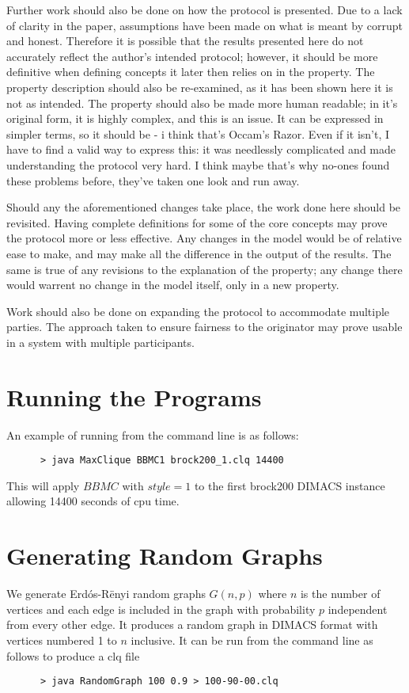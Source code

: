 \documentclass{l4proj}
\begin{document}
Further work should also be done on how the protocol is presented. Due to a lack of clarity in the paper, assumptions have been made on what is meant by corrupt and honest. Therefore it is possible that the results presented here do not accurately reflect the author's intended protocol; however, it should be more definitive when defining concepts it later then relies on in the property. The property description should also be re-examined, as it has been shown here it is not as intended. The property should also be made more human readable; in it's original form, it is highly complex, and this is an issue. It can be expressed in simpler terms, so it should be - i think that's Occam's Razor. Even if it isn't, I have to find a valid way to express this: it was needlessly complicated and made understanding the protocol very hard. I think maybe that's why no-ones found these problems before, they've taken one look and run away.

Should any the aforementioned changes take place, the work done here should be revisited. Having complete definitions for some of the core concepts may prove the protocol more or less effective. Any changes in the model would be of relative ease to make, and may make all the difference in the output of the results. The same is true of any revisions to the explanation of the property; any change there would warrent no change in the model itself, only in a new property.

Work should also be done on expanding the protocol to accommodate multiple parties. The approach taken to ensure fairness to the originator may prove usable in a system with multiple participants.




\begin{appendices}

\chapter{Running the Programs}
An example of running from the command line is as follows:
\begin{verbatim}
      > java MaxClique BBMC1 brock200_1.clq 14400
\end{verbatim}
This will apply $BBMC$ with $style = 1$ to the first brock200 DIMACS instance allowing 14400 seconds of cpu time.

\chapter{Generating Random Graphs}
\label{sec:randomGraph}
We generate Erd\'{o}s-R\"{e}nyi random graphs $G(n,p)$ where $n$ is the number of vertices and
each edge is included in the graph with probability $p$ independent from every other edge. It produces
a random graph in DIMACS format with vertices numbered 1 to $n$ inclusive. It can be run from the command line as follows to produce 
a clq file
\begin{verbatim}
      > java RandomGraph 100 0.9 > 100-90-00.clq
\end{verbatim}
\end{appendices}

\nocite{*}


\end{document}
